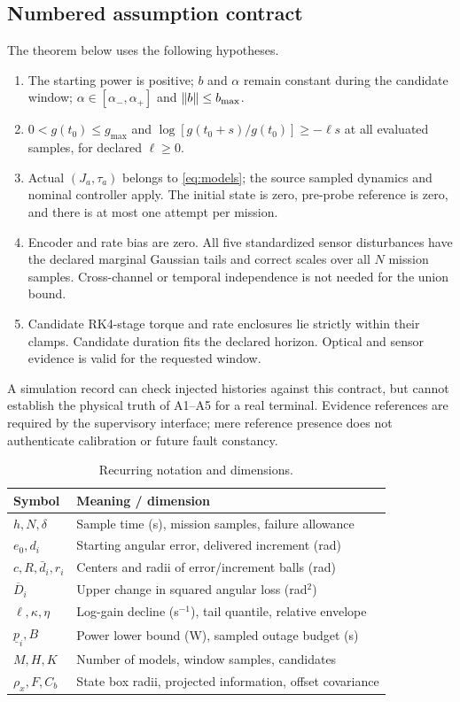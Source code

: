 \subsection{Numbered assumption contract}
The theorem below uses the following hypotheses.
\begin{enumerate}
\item[A1.] The starting power is positive; $b$ and $\alpha$ remain constant during the candidate window; $\alpha\in[\alpha_-,\alpha_+]$ and $\lVert b\rVert\leq b_{\max}$.
\item[A2.] $0<g(t_0)\leq g_{\max}$ and $\log[g(t_0+s)/g(t_0)]\geq-\ell s$ at all evaluated samples, for declared $\ell\geq0$.
\item[A3.] Actual $(J_a,\tau_a)$ belongs to \eqref{eq:models}; the source sampled dynamics and nominal controller apply. The initial state is zero, pre-probe reference is zero, and there is at most one attempt per mission.
\item[A4.] Encoder and rate bias are zero. All five standardized sensor disturbances have the declared marginal Gaussian tails and correct scales over all $N$ mission samples. Cross-channel or temporal independence is not needed for the union bound.
\item[A5.] Candidate RK4-stage torque and rate enclosures lie strictly within their clamps. Candidate duration fits the declared horizon. Optical and sensor evidence is valid for the requested window.
\end{enumerate}
A simulation record can check injected histories against this contract, but cannot establish the physical truth of A1--A5 for a real terminal. Evidence references are required by the supervisory interface; mere reference presence does not authenticate calibration or future fault constancy.

\begin{table}[t]
\caption{Recurring notation and dimensions.}
\centering\footnotesize
\begin{tabular}{@{}p{}p{}@{}}\toprule
Symbol & Meaning / dimension\\\midrule
$h,N,\delta$ & Sample time (s), mission samples, failure allowance\\
$e_0,d_i$ & Starting angular error, delivered increment (rad)\\
$c,R,\bar d_i,r_i$ & Centers and radii of error/increment balls (rad)\\
$\overline D_i$ & Upper change in squared angular loss (rad$^2$)\\
$\ell,\kappa,\eta$ & Log-gain decline (s$^{-1}$), tail quantile, relative envelope\\
$\underline p_i,B$ & Power lower bound (W), sampled outage budget (s)\\
$M,H,K$ & Number of models, window samples, candidates\\
$\rho_x,F,C_b$ & State box radii, projected information, offset covariance\\\bottomrule
\end{tabular}
\end{table}

